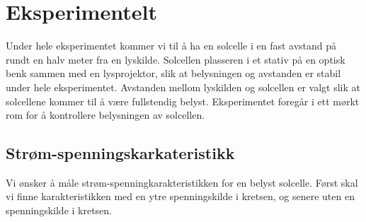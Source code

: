\documentclass[%
 reprint,
 amsmath,amssymb,
 aps,
 norsk,
 booktabs
]{revtex4-1}
\begin{document}
\section{Eksperimentelt}
Under hele eksperimentet kommer vi til å ha en solcelle i en fast avstand på rundt en halv meter fra en lyskilde. Solcellen plasseren i et stativ på en optisk benk sammen med en lysprojektor, slik at belysningen og avstanden er stabil under hele eksperimentet. Avstanden mellom lyskilden og solcellen er valgt slik at solcellene kommer til å være fullstendig belyst. Eksperimentet foregår i ett mørkt rom for å kontrollere belysningen av solcellen.\\
\subsection{Strøm-spenningskarkateristikk}
Vi ønsker å måle strøm-spenningkarakteristikken for en belyst solcelle. Først skal vi finne karakteristikken med en ytre spenningskilde i kretsen, og senere uten en spenningskilde i kretsen.
\end{document}
